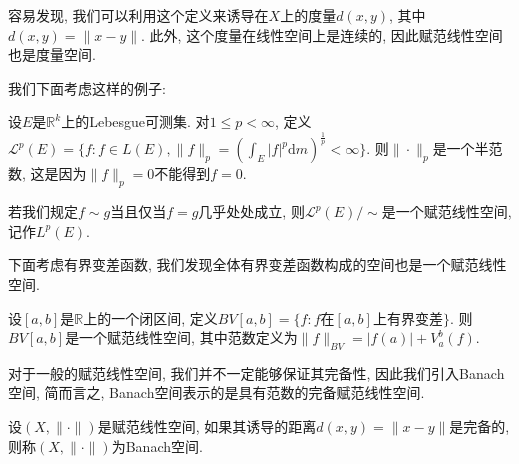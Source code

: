 \documentclass[theorem=false,mathfont=none,openany,sub3section]{easybook}
\begin{document}
\begin{remark}
  容易发现, 我们可以利用这个定义来诱导在$X$上的度量$d(x,y)$, 其中$d(x,y) = \|x-y\|$. 此外, 这个度量在线性空间上是连续的, 因此赋范线性空间也是度量空间.\par
\end{remark}

我们下面考虑这样的例子:\par

\begin{example}
  设$E$是$\mathbb{R}^k$上的Lebesgue可测集. 对$1\leqslant p <\infty$, 定义$\mathcal{L}^p(E)=\{f: f\in L(E), \|f\|_p=\left(\int_{E}|f|^p \mathrm{d}m\right)^{\frac{1}{p}} < \infty\}$. 则$\|\cdot\|_p$是一个半范数, 这是因为$\|f\|_p=0$不能得到$f=0$.\par
  若我们规定$f\sim g$当且仅当$f=g$几乎处处成立, 则$\mathcal{L}^p(E)/\sim$是一个赋范线性空间, 记作$L^p(E)$.\par
\end{example}

下面考虑有界变差函数, 我们发现全体有界变差函数构成的空间也是一个赋范线性空间.\par

\begin{example}
  设$[a,b]$是$\mathbb{R}$上的一个闭区间, 定义$BV[a,b]=\{f: f \text{在}[a,b] \text{上有界变差}\}$. 则$BV[a,b]$是一个赋范线性空间, 其中范数定义为$\|f\|_{BV} = |f(a)| + V_a^b(f)$.\par
\end{example}

对于一般的赋范线性空间, 我们并不一定能够保证其完备性, 因此我们引入Banach空间, 简而言之, Banach空间表示的是具有范数的完备赋范线性空间.\par

\begin{definition}
  设$(X,\|\cdot\|)$是赋范线性空间, 如果其诱导的距离$d(x,y) = \|x-y\|$是完备的, 则称$(X,\|\cdot\|)$为Banach空间.\par
\end{definition}

\backmatter
\end{document}
